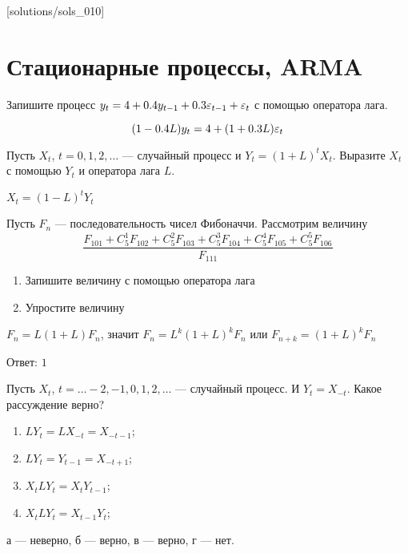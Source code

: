 [solutions/sols_010]

\chapter{Стационарные процессы, ARMA}


\begin{problem}
Запишите процесс $y_t = 4 + 0.4y_{t-1} + 0.3\varepsilon_{t-1} + \varepsilon_t$ с помощью оператора лага.
\begin{sol}
\[
(1 - 0.4L)y_t = 4 + (1 + 0.3L)\varepsilon_t
\]
\end{sol}
\end{problem}


\begin{problem}
Пусть $X_{t}$, $t=0,1,2, \ldots$ — случайный процесс и $Y_{t}=(1+L)^{t}X_{t}$.
Выразите $X_{t}$ с помощью $Y_{t}$ и оператора лага $L$.

\begin{sol}
$X_{t}=(1-L)^{t}Y_{t}$
\end{sol}
\end{problem}

\begin{problem}
Пусть $ F_{n} $ — последовательность чисел Фибоначчи. Рассмотрим величину
\[
\frac{F_{101}+C^{1}_{5}F_{102}+C^{2}_{5}F_{103}+C^{3}_{5}F_{104}+C^{4}_{5}F_{105}+C^{5}_{5}F_{106}}
{F_{111}}
\]
\begin{enumerate}
\item Запишите величину с помощью оператора лага
\item Упростите величину
\end{enumerate}

\begin{sol}
$ F_{n}=L(1+L)F_{n} $, значит $ F_{n}=L^{k}(1+L)^{k}F_{n} $ или $ F_{n+k}=(1+L)^{k}F_{n} $

Ответ: $1$
\end{sol}
\end{problem}




\begin{problem}
Пусть $X_{t}$, $t=\ldots -2,-1,0,1,2,\ldots $ — случайный процесс. И $Y_{t}=X_{-t}$. Какое рассуждение верно?

\begin{enumerate}
\item $LY_{t}=LX_{-t}=X_{-t-1}$;
\item $LY_{t}=Y_{t-1}=X_{-t+1}$;
\item $X_t L Y_t = X_t Y_{t-1}$;
\item $X_t L Y_t = X_{t-1} Y_t$;
\end{enumerate}
\begin{sol}
а — неверно, б — верно, в — верно, г — нет.
\end{sol}
\end{problem}


